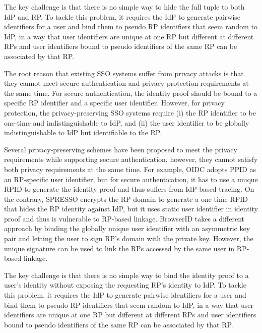 The key challenge is that there is no simple way to hide the full tuple to both IdP and RP. To tackle this problem, it requires the IdP to generate pairwise identifiers for a user and bind them to pseudo RP identifiers that seem random to IdP, in a way that user identifiers are unique at one RP but different at different RPs and user identifiers bound to pseudo identifiers of the same RP can be associated by that RP.




{\color{red}
The root reason that existing SSO systems suffer from privacy attacks is that they cannot meet secure authentication and privacy protection requirements
at the same time. %
For secure authentication, the identity proof should be bound to a specific RP identifier and a specific user identifier. %
However, for privacy protection, the privacy-preserving SSO systems require (i) the RP identifier to be one-time and indistinguishable to IdP, and (ii) the user identifier to be globally indistinguishable to IdP but identifiable to the RP. %

Several privacy-preserving schemes have been proposed to meet the privacy requirements while supporting secure authentication, however, they cannot satisfy both privacy requirements at the same time. For example, OIDC adopts PPID as an RP-specific user identifier, but for secure authentication, it has to use a unique RPID to generate the identity proof and thus suffers from IdP-based tracing. On the contrary, SPRESSO encrypts the RP domain to generate a one-time RPID that hides the RP identity against IdP, but it uses static user identifier in identity proof and thus is vulnerable to RP-based linkage. BrowserID takes a different approach by binding the globally unique user identifier with an asymmetric key pair and letting the user to sign RP's domain with the private key. However, the unique signature can be used to link the RPs accessed by the same user in RP-based linkage.

The key challenge is that there is no simple way to bind the identity proof to a user's identity without exposing the requesting RP's identity to IdP. To tackle this problem, it requires the IdP to generate pairwise identifiers for a user and bind them to pseudo RP identifiers that seem random to IdP, in a way that user identifiers are unique at one RP but different at different RPs and user identifiers bound to pseudo identifiers of the same RP can be associated by that RP.
}


